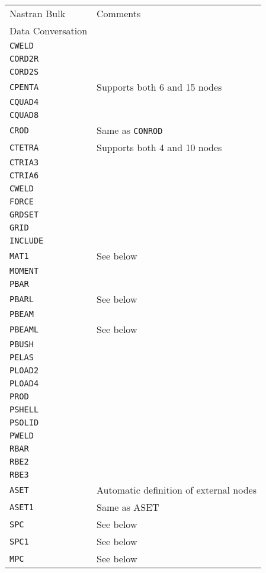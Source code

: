 \begin{tabular}{| m{} |  m{} |}
  \hline
  \rowcolor[HTML]{EFEFEF} Nastran Bulk      & Comments \\
  \rowcolor[HTML]{EFEFEF} Data Conversation &          \\
  \hline\hline
  {\tt CWELD}  & \\\hline
  {\tt CORD2R} & \\\hline
  {\tt CORD2S} & \\\hline
  {\tt CPENTA} & Supports both 6 and 15 nodes \\\hline
  {\tt CQUAD4} & \\\hline
  {\tt CQUAD8} & \\\hline
  {\tt CROD}   & Same as {\tt CONROD} \\\hline
  {\tt CTETRA} & Supports both 4 and 10 nodes \\\hline
  {\tt CTRIA3} & \\\hline
  {\tt CTRIA6} & \\\hline
  {\tt CWELD}  & \\\hline
  {\tt FORCE}  & \\\hline
  {\tt GRDSET} & \\\hline
  {\tt GRID}   & \\\hline
  {\tt INCLUDE} & \\\hline
  {\tt MAT1}   & See below \\\hline
  {\tt MOMENT} & \\\hline
  {\tt PBAR}   & \\\hline
  {\tt PBARL}  & See below \\\hline
  {\tt PBEAM}  & \\\hline
  {\tt PBEAML} & See below \\\hline
  {\tt PBUSH}  & \\\hline
  {\tt PELAS}  & \\\hline
  {\tt PLOAD2} & \\\hline
  {\tt PLOAD4} & \\\hline
  {\tt PROD}   & \\\hline
  {\tt PSHELL} & \\\hline
  {\tt PSOLID} & \\\hline
  {\tt PWELD}  & \\\hline
  {\tt RBAR}   & \\\hline
  {\tt RBE2}   & \\\hline
  {\tt RBE3}   & \\\hline
  {\tt ASET}   & Automatic definition of external nodes \\\hline
  {\tt ASET1}  & Same as ASET \\\hline
  {\tt SPC}    & See below \\\hline
  {\tt SPC1}   & See below \\\hline
  {\tt MPC}    & See below \\\hline
\end{tabular}

